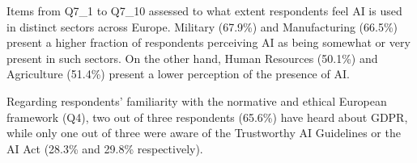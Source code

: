 \documentclass{article}
\begin{document}


Items from Q7\_1 to Q7\_10 assessed to what extent respondents feel AI is used in distinct sectors across Europe.
Military (67.9\%) and Manufacturing (66.5\%) present a higher fraction of respondents perceiving AI as being somewhat or very present in such sectors. On the other hand, Human Resources (50.1\%) and Agriculture (51.4\%) present a lower perception of the presence of AI. 

Regarding respondents' familiarity with the normative and ethical European framework (Q4), two out of three respondents (65.6\%) have heard about GDPR, while only one out of three were aware of the Trustworthy AI Guidelines or the AI Act (28.3\% and 29.8\% respectively).
\end{document}
